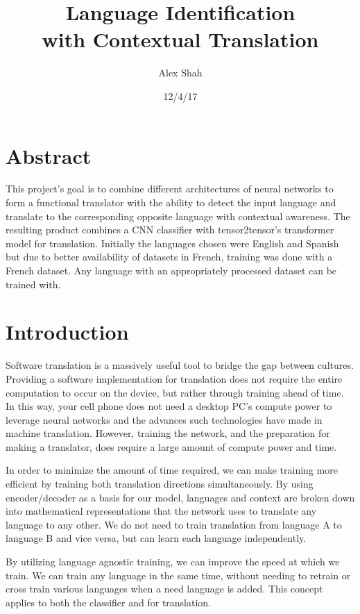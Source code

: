 \documentclass[10pt,a4paper]{article}
\begin{document}
\title{Language Identification \\ with Contextual Translation}
\author{Alex Shah}
\date{12/4/17}

\maketitle

\section{Abstract}
   This project's goal is to combine different architectures of neural networks to form a functional translator with the ability to detect the input language and translate to the corresponding opposite language with contextual awareness. The resulting product combines a CNN classifier with tensor2tensor's transformer model for translation. Initially the languages chosen were English and Spanish but due to better availability of datasets in French, training was done with a French dataset. Any language with an appropriately processed dataset can be trained with.

\section{Introduction}
  Software translation is a massively useful tool to bridge the gap between cultures. Providing a software implementation for translation does not require the entire computation to occur on the device, but rather through training ahead of time. In this way, your cell phone does not need a desktop PC's compute power to leverage neural networks and the advances such technologies have made in machine translation. However, training the network, and the preparation for making a translator, does require a large amount of compute power and time.

  In order to minimize the amount of time required, we can make training more efficient by training both translation directions simultaneously. By using encoder/decoder as a basis for our model, languages and context are broken down into mathematical representations that the network uses to translate any language to any other. We do not need to train translation from language A to language B and vice versa, but can learn each language independently.

  By utilizing language agnostic training, we can improve the speed at which we train. We can train any language in the same time, without needing to retrain or cross train various languages when a need language is added. This concept applies to both the classifier and for translation. 
\end{document}
